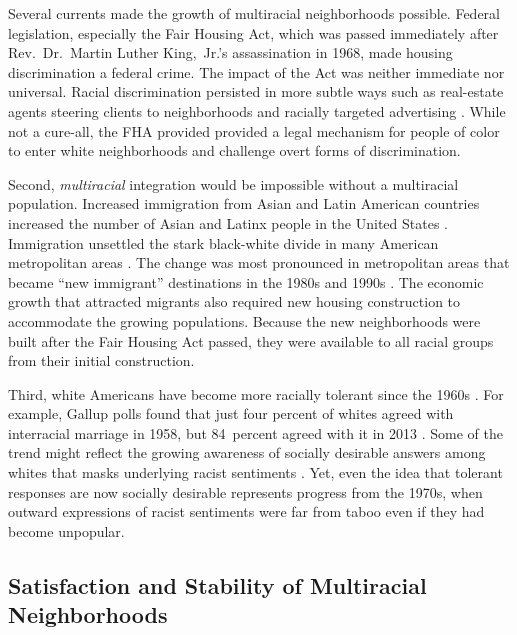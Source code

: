 \documentclass{baderart}
\begin{document}
Several currents made the growth of multiracial neighborhoods possible. Federal legislation, especially the Fair Housing Act, which was passed immediately after Rev.~Dr.~Martin Luther King,~Jr.'s assassination in 1968, made housing discrimination a federal crime. The impact of the Act was neither immediate nor universal. Racial discrimination persisted in more subtle ways such as real-estate agents steering clients to neighborhoods and racially targeted advertising \citep{ross_housing_2005, roscigno_complexities_2009}. While not a cure-all, the FHA provided provided a legal mechanism for people of color to enter white neighborhoods and challenge overt forms of discrimination. 

Second, \emph{multiracial} integration would be impossible without a multiracial population. Increased immigration from Asian and Latin American countries increased the number of Asian and Latinx people in the United States \citep{denton_patterns_1991, frey_latino_1996, singer_rise_2001}. Immigration unsettled the stark black-white divide in many American metropolitan areas \citep{alba_neighborhood_1995, logan_segregation_2004, friedman_declines_2008}. The change was most pronounced in metropolitan areas that became ``new immigrant'' destinations in the 1980s and 1990s \citep{singer_rise_2001, lichter_immigrant_2009}. The economic growth that attracted migrants also required new housing construction to accommodate the growing populations. Because the new neighborhoods were built after the Fair Housing Act passed, they were available to all racial groups from their initial construction. 

Third, white Americans have become more racially tolerant since the 1960s \citep{schuman_racial_1997}. For example, Gallup polls found that just four percent of whites agreed with interracial marriage in 1958, but 84~percent agreed with it in 2013 \citep{newport_u.s._2013}. Some of the trend might reflect the growing awareness of socially desirable answers among whites that masks underlying racist sentiments \citep{jackman_education_1984, bonilla-silva_racism_2003}. Yet, even the idea that tolerant responses are now socially desirable represents progress from the 1970s, when outward expressions of racist sentiments were far from taboo even if they had become unpopular.

\subsection{Satisfaction and Stability of Multiracial Neighborhoods}\label{sec:satisfaction-stability}
\end{document}
